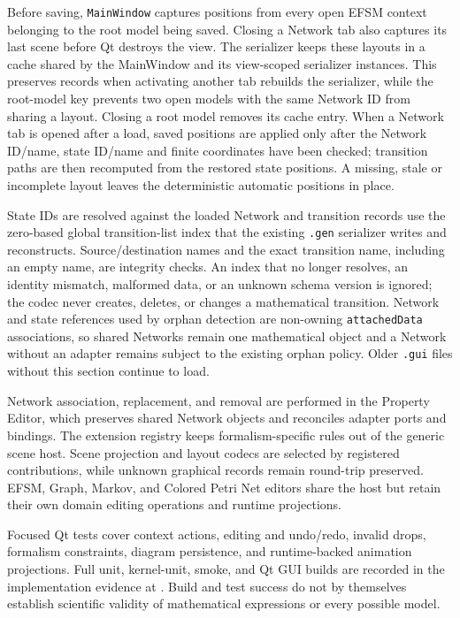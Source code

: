 Before saving, \texttt{MainWindow} captures positions from every open EFSM
context belonging to the root model being saved. Closing a Network tab also
captures its last scene before Qt destroys the view. The serializer keeps these
layouts in a cache shared by the MainWindow and its view-scoped serializer
instances. This preserves records when activating another tab rebuilds the
serializer, while the root-model key prevents two open models with the same
Network ID from sharing a layout. Closing a root model removes its cache entry.
When a Network tab is opened after a load, saved positions are applied only
after the Network ID/name, state ID/name and finite coordinates have been
checked; transition paths are then recomputed from the restored state
positions. A missing, stale or incomplete layout leaves the deterministic
automatic positions in place.

State IDs are resolved against the loaded Network and transition records use
the zero-based global transition-list index that the existing \texttt{.gen}
serializer writes and reconstructs. Source/destination names and the exact
transition name, including an empty name, are integrity checks. An index that
no longer resolves, an identity mismatch, malformed data, or an unknown schema
version is ignored;
the codec never creates, deletes, or changes a mathematical transition.
Network and state references used by orphan detection are non-owning
\texttt{attachedData} associations, so shared Networks remain one mathematical
object and a Network without an adapter remains subject to the existing orphan
policy. Older \texttt{.gui} files without this section continue to load.

Network association, replacement, and removal are performed in the Property
Editor, which preserves shared Network objects and reconciles adapter ports
and bindings. The extension registry keeps formalism-specific rules out of
the generic scene host. Scene projection and layout codecs are selected by
registered contributions, while unknown graphical records remain round-trip
preserved. EFSM, Graph, Markov, and Colored Petri Net editors share the host
but retain their own domain editing operations and runtime projections.

Focused Qt tests cover context actions, editing and undo/redo, invalid drops,
formalism constraints, diagram persistence, and runtime-backed animation
projections. Full unit, kernel-unit, smoke, and Qt GUI builds are recorded in
the implementation evidence at
.
Build and test success do not by themselves establish scientific validity of
mathematical expressions or every possible model.

